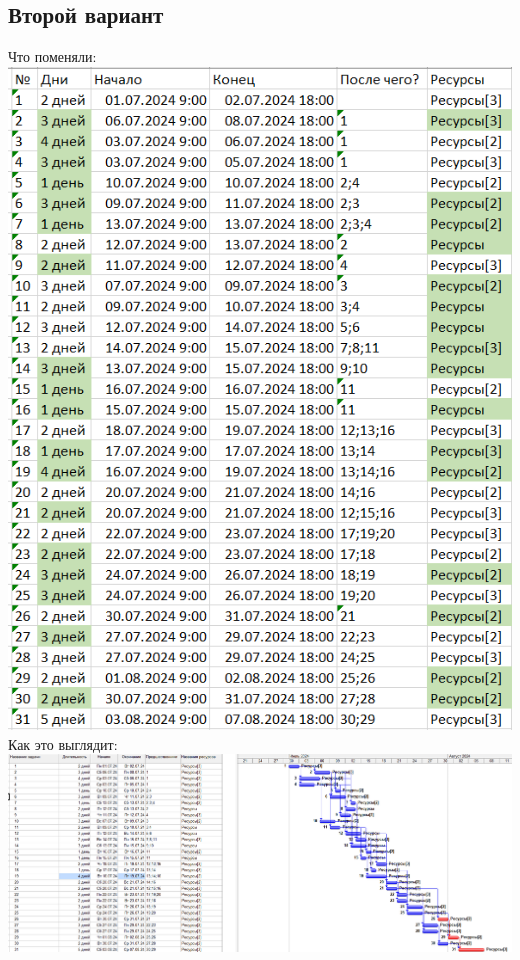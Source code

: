 \documentclass[14pt]{article}
\begin{document}
	\subsection{Второй вариант}
		{\LARGE Что поменяли:}\\
		\includegraphics[height=0.6\textheight]{../img/1b2_days_change.png}\\ 
		{\LARGE Как это выглядит:}\\
		\includegraphics[width=\textwidth]{../img/ot1b2_1.png}\\
\end{document}
